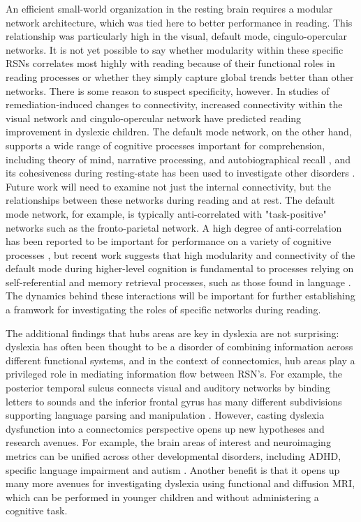An efficient small-world organization in the resting brain requires a modular network architecture, which was tied here to better performance in reading. This relationship was particularly high in the visual, default mode, cingulo-opercular networks. It is not yet possible to say whether modularity within these specific RSNs correlates most highly with reading because of their functional roles in reading processes or whether they simply capture global trends better than other networks. There is some reason to suspect specificity, however. In studies of remediation-induced changes to connectivity, increased connectivity within the visual network \citep{Koyama2013} and cingulo-opercular network \citep{HorowitzKraus2015} have predicted reading improvement in dyslexic children. The default mode network, on the other hand, supports a wide range of cognitive processes important for comprehension, including theory of mind, narrative processing, and autobiographical recall \citep{Buckner2008, AbdulSabur2014}, and its cohesiveness during resting-state has been used to investigate other disorders \citep{Uddin2008}. Future work will need to examine not just the internal connectivity, but the relationships between these networks during reading and at rest. The default mode network, for example, is typically anti-correlated with "task-positive" networks such as the fronto-parietal network. A high degree of anti-correlation has been reported to be important for performance on a variety of cognitive processes \citep{Fox2005, Keller2015}, but recent work suggests that high modularity and connectivity of the default mode during higher-level cognition is fundamental to processes relying on self-referential and memory retrieval processes, such as those found in language \citep{Vatansever2015}. The dynamics behind these interactions will be important for further establishing a framwork for investigating the roles of specific networks during reading. 

The additional findings that hubs areas are key in dyslexia are not surprising: dyslexia has often been thought to be a disorder of combining information across different functional systems, and in the context of connectomics, hub areas play a privileged role in mediating information flow between RSN’s. For example, the posterior temporal sulcus connects visual and auditory networks by binding letters to sounds \citep{Blau2010, VanAtteveldt2009} and the inferior frontal gyrus has many different subdivisions supporting language parsing and manipulation \citep{Hagoort2005}. However, casting dyslexia dysfunction into a connectomics perspective opens up new hypotheses and research avenues. For example, the brain areas of interest and neuroimaging metrics can be unified across other developmental disorders, including ADHD, specific language impairment and autism \citep{Stam2014}. Another benefit is that it opens up many more avenues for investigating dyslexia using functional and diffusion MRI, which can be performed in younger children and without administering a cognitive task. 

